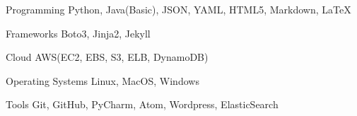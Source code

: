 

\begin{cvskills}

  \cvskill
    {Programming} %
    {Python, Java(Basic), JSON, YAML, HTML5, Markdown, LaTeX} %

  \cvskill
    {Frameworks} %
    {Boto3, Jinja2, Jekyll} %

  \cvskill
    {Cloud} %
    {AWS(EC2, EBS, S3, ELB, DynamoDB)} %


  \cvskill
    {Operating Systems} %
    {Linux, MacOS, Windows} %


  \cvskill
    {Tools} %
    {Git, GitHub, PyCharm, Atom, Wordpress, ElasticSearch} %

\end{cvskills}
